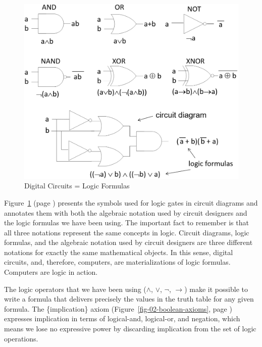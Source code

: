 \begin{figure}
\begin{center}
\includegraphics[scale=0.25]{images/LogicGates.png}
\end{center}
\caption{Digital Circuits = Logic Formulas}
\label{fig-02-logic-gates}
\end{figure}

Figure~\ref{fig-02-logic-gates} (page \pageref{fig-02-logic-gates})
presents the symbols used for logic gates in circuit diagrams
and annotates them with both
the algebraic notation used by circuit designers
and the logic formulas we have been using.
The important fact to remember is that all three notations
represent the same concepts in logic. Circuit diagrams, logic formulas,
and the algebraic notation used by circuit designers are three
different notations for exactly the same mathematical objects.
In this sense, digital circuits, and, therefore, computers,
are materializations of logic formulas.
Computers are logic in action.

The logic operators that we have been using
($\wedge$, $\vee$, $\neg$, $\rightarrow$)
make it possible to write a formula
that delivers precisely the values in the truth table
for any given formula.
The \{implication\} axiom
(Figure~\ref{fig-02-boolean-axioms}, page \pageref{fig-02-boolean-axioms})
expresses implication in terms of logical-and, logical-or,
and negation, which means we lose no expressive power by
discarding implication from the set of logic operations.

